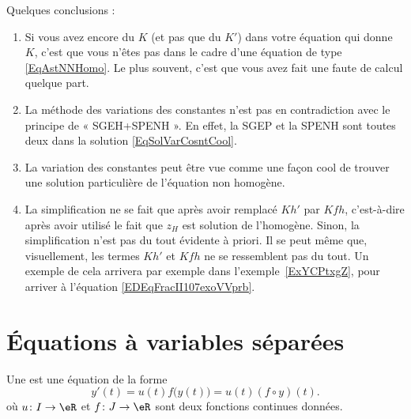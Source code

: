 Quelques conclusions :

\begin{enumerate}
	\item
	      Si vous avez encore du \( K\) (et pas que du \( K'\)) dans votre équation qui donne \( K\), c'est que vous n'êtes pas dans le cadre d'une équation de type \eqref{EqAstNNHomo}. Le plus souvent, c'est que vous avez fait une faute de calcul quelque part.

	\item
	      La méthode des variations des constantes n'est pas en contradiction avec le principe de « SGEH+SPENH ». En effet, la SGEP et la SPENH sont toutes deux dans la solution \eqref{EqSolVarCosntCool}.

	\item
	      La variation des constantes peut être vue comme une façon cool de trouver une solution particulière de l'équation non homogène.

	\item
	      La simplification ne se fait que après avoir remplacé \( Kh'\) par \( Kfh\), c'est-à-dire après avoir utilisé le fait que \( z_H\) est solution de l'homogène. Sinon, la simplification n'est pas du tout évidente à priori. Il se peut même que, visuellement, les termes \( Kh'\) et \( Kfh\) ne se ressemblent pas du tout. Un exemple de cela arrivera par exemple dans l'exemple~\ref{ExYCPtxgZ}, pour arriver à l'équation \eqref{EDEqFracII107exoVVprb}.

\end{enumerate}


\section{Équations à variables séparées}
\label{Secvarsep}

\begin{definition}	\label{DEFooZHNTooWISQeX}
	Une  est une équation  de la forme
	\begin{equation}		\label{EqDiffSeparee}
		y'(t)=u(t)f\big( y(t) \big)=u(t)(f\circ y)(t).
	\end{equation}
	où \( u\colon I\to \eR\) et \( f\colon J\to \eR\) sont deux fonctions continues données.
\end{definition}

